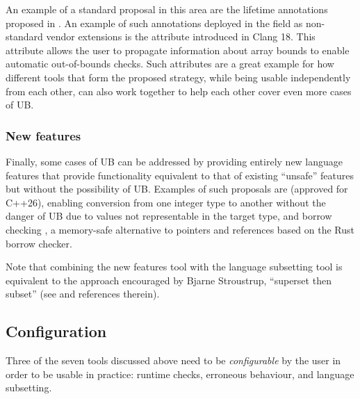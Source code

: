 An example of a standard proposal in this area are the lifetime annotations proposed in \cite{P2771R1}. An example of such annotations deployed in the field as non-standard vendor extensions is the  attribute introduced in Clang 18. This attribute allows the user to propagate information about array bounds to enable automatic out-of-bounds checks. Such attributes are a great example for how different tools that form the proposed strategy, while being usable independently from each other, can also work together to help each other cover even more cases of UB.

\subsubsection{New features}
\label{newfeatures}

Finally, some cases of UB can be addressed by providing entirely new language features that provide functionality equivalent to that of existing ``unsafe'' features but without the possibility of UB. Examples of such proposals are  \cite{P0543R3} (approved for C++26), enabling conversion from one integer type to another without the danger of UB due to values not representable in the target type, and borrow checking \cite{P3390R0}, a memory-safe alternative to pointers and references based on the Rust borrow checker.

Note that combining the new features tool with the language subsetting tool is equivalent to the approach encouraged by Bjarne Stroustrup, ``superset then subset'' (see \cite{P3650R0} and references therein).

\subsection{Configuration}
\label{config}


Three of the seven tools discussed above need to be \emph{configurable} by the user in order to be usable in practice: runtime checks, erroneous behaviour, and language subsetting.

